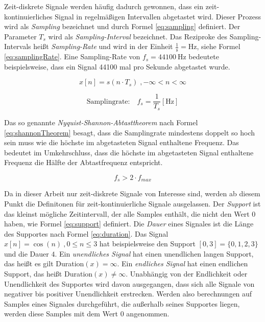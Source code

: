 Zeit-diskrete Signale werden häufig dadurch gewonnen, dass ein zeit-kontinuierliches Signal in regelmäßigen Intervallen abgetastet wird. Dieser Prozess wird als \emph{Sampling} bezeichnet und durch Formel \ref{eq:sampling} definiert. Der Parameter $T_s$ wird als \emph{Sampling-Interval} bezeichnet. Das Reziproke des Sampling-Intervals heißt \emph{Sampling-Rate} und wird in der Einheit $\frac{1}{\text{s}} = \text{Hz}$, siehe Formel \ref{eq:samplingRate}. Eine Sampling-Rate von $f_s = \SI{44100}{\hertz}$ bedeutete beispielsweise, dass ein Signal 44100 mal pro Sekunde abgetastet wurde.\cite[S. 24]{dspMichigan}

\begin{equation}
x[n] = s(n \cdot T_s) \; , -\infty < n < \infty
\label{eq:sampling}
\end{equation}
	
\begin{equation}
	\text{Samplingrate:} \quad f_s = \frac{1}{T_s} [\text{Hz}]
	\label{eq:samplingRate}
\end{equation}	

Das so genannte \emph{Nyquist-Shannon-Abtasttheorem} nach Formel \ref{eq:shannonTheorem} besagt, dass die Samplingrate mindestens doppelt so hoch sein muss wie die höchste im abgetasteten Signal enthaltene Frequenz. Das bedeutet im Umkehrschluss, dass die höchste im abgetasteten Signal enthaltene Frequenz die Hälfte der Abtastfrequenz entspricht.

\begin{equation}
f_s > 2 \cdot f_{max}
\label{eq:shannonTheorem}
\end{equation}	
	
Da in dieser Arbeit nur zeit-diskrete Signale von Interesse sind, werden ab diesem Punkt die Definitonen für zeit-kontinuierliche Signale ausgelassen. Der \emph{Support} ist das kleinst mögliche Zeitintervall, der alle Samples enthält, die nicht den Wert 0 haben, wie Formel \ref{eq:support} definiert. Die \emph{Dauer} eines Signales ist die Länge des Supportes nach Formel \ref{eq:duration}. Das Signal $x[n] = \cos(n) \: ,0\leq n \leq 3$ hat beispielsweise den Support $[0,3] = \{0,1,2,3\} $ und die Dauer $4$. Ein \emph{unendliches Signal} hat einen unendlichen langen Support, das heißt es gilt Duration$(x) = \infty$. Ein \emph{endliches Signal} hat einen endlichen Support, das heißt Duration$(x) \neq\infty$. Unabhängig von der Endlichkeit oder Unendlichkeit des Supportes wird davon ausgegangen, dass sich alle Signale von negativer bis positiver Unendlichkeit erstrecken. Werden also berechnungen auf Samples eines Signales durchgeführt, die außerhalb seines Supportes liegen, werden diese Samples mit dem Wert 0 angenommen. \cite[S. 24]{dspMichigan}

